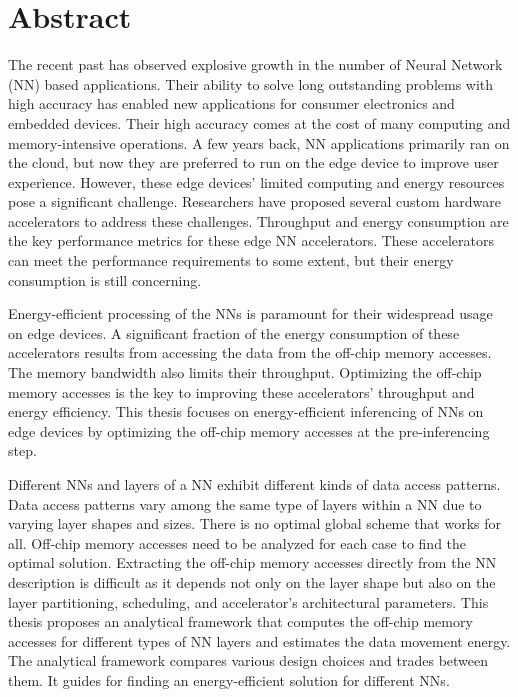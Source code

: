 \chapter*{Abstract}
The recent past has observed explosive growth in the number of Neural Network (NN) based applications. Their ability to solve long outstanding problems with high accuracy has enabled new applications for consumer electronics and embedded devices. Their high accuracy comes at the cost of many computing and memory-intensive operations. A few years back, NN applications primarily ran on the cloud, but now they are preferred to run on the edge device to improve user experience. However, these edge devices’ limited computing and energy resources pose a significant challenge. Researchers have proposed several custom hardware accelerators to address these challenges. Throughput and energy consumption are the key performance metrics for these edge NN accelerators. These accelerators can meet the performance requirements to some extent, but their energy consumption is still concerning.

Energy-efficient processing of the NNs is paramount for their widespread usage on edge devices. A significant fraction of the energy consumption of these accelerators results from accessing the data from the off-chip memory accesses. The memory bandwidth also limits their throughput. Optimizing the off-chip memory accesses is the key to improving these accelerators' throughput and energy efficiency. This thesis focuses on energy-efficient inferencing of NNs on edge devices by optimizing the off-chip memory accesses at the pre-inferencing step.

Different NNs and layers of a NN exhibit different kinds of data access patterns. Data access patterns vary among the same type of layers within a NN due to varying layer shapes and sizes. There is no optimal global scheme that works for all. Off-chip memory accesses need to be analyzed for each case to find the optimal solution. Extracting the off-chip memory accesses directly from the NN description is difficult as it depends not only on the layer shape but also on the layer partitioning, scheduling, and accelerator's architectural parameters. This thesis proposes an analytical framework that computes the off-chip memory accesses for different types of NN layers and estimates the data movement energy. The analytical framework compares various design choices and trades between them. It guides for finding an energy-efficient solution for different NNs.

